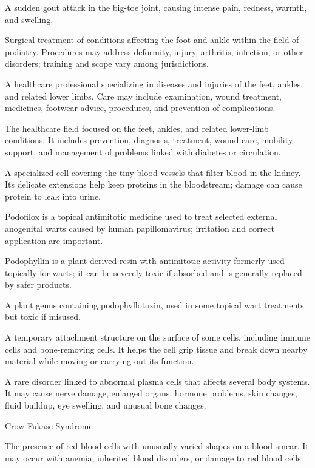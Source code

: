  A sudden gout attack in the big-toe joint, causing intense pain, redness, warmth, and swelling.

 Surgical treatment of conditions affecting the foot and ankle within the field of podiatry. Procedures may address deformity, injury, arthritis, infection, or other disorders; training and scope vary among jurisdictions.

 A healthcare professional specializing in diseases and injuries of the feet, ankles, and related lower limbs. Care may include examination, wound treatment, medicines, footwear advice, procedures, and prevention of complications.

 The healthcare field focused on the feet, ankles, and related lower-limb conditions. It includes prevention, diagnosis, treatment, wound care, mobility support, and management of problems linked with diabetes or circulation.

 A specialized cell covering the tiny blood vessels that filter blood in the kidney. Its delicate extensions help keep proteins in the bloodstream; damage can cause protein to leak into urine.

 Podofilox is a topical antimitotic medicine used to treat selected external anogenital warts caused by human papillomavirus; irritation and correct application are important.

 Podophyllin is a plant-derived resin with antimitotic activity formerly used topically for warts; it can be severely toxic if absorbed and is generally replaced by safer products.

 A plant genus containing podophyllotoxin, used in some topical wart treatments but toxic if misused.

 A temporary attachment structure on the surface of some cells, including immune cells and bone-removing cells. It helps the cell grip tissue and break down nearby material while moving or carrying out its function.

 A rare disorder linked to abnormal plasma cells that affects several body systems. It may cause nerve damage, enlarged organs, hormone problems, skin changes, fluid buildup, eye swelling, and unusual bone changes.

\synonyms
Crow-Fukase Syndrome

 The presence of red blood cells with unusually varied shapes on a blood smear. It may occur with anemia, inherited blood disorders, or damage to red blood cells.

